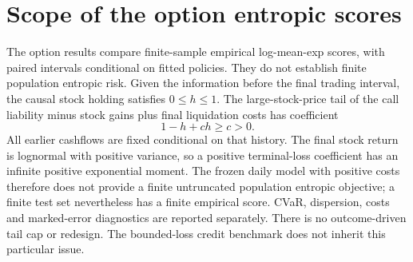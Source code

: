 \section*{Scope of the option entropic scores}
The option results compare finite-sample empirical log-mean-exp scores, with paired intervals conditional on fitted policies. They do not establish finite population entropic risk.
Given the information before the final trading interval, the causal stock holding satisfies $0\le h\le1$. The large-stock-price tail of the call liability minus stock gains plus final liquidation costs has coefficient
\[1-h+ch\ge c>0.\]
All earlier cashflows are fixed conditional on that history. The final stock return is lognormal with positive variance, so a positive terminal-loss coefficient has an infinite positive exponential moment. The frozen daily model with positive costs therefore does not provide a finite untruncated population entropic objective; a finite test set nevertheless has a finite empirical score.
CVaR, dispersion, costs and marked-error diagnostics are reported separately. There is no outcome-driven tail cap or redesign. The bounded-loss credit benchmark does not inherit this particular issue.
